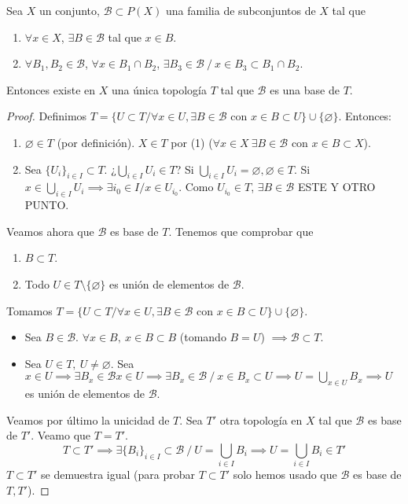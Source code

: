 \begin{nth}
  Sea $X$ un conjunto, $\mathcal{B} \subset P(X)$ una familia de subconjuntos de $X$ tal que
  \begin{enumerate}
    \item $\forall x \in X$, $\exists B \in \mathcal{B}$ tal que $x \in B$.
    \item $\forall B_1,B_2 \in \mathcal{B}$, $\forall x \in B_1 \cap B_2$, $\exists B_3 \in \mathcal{B}\ /\ x \in B_3 \subset B_1 \cap B_2$.
  \end{enumerate}
  Entonces existe en $X$ una única topología $T$ tal que $\mathcal{B}$ es una base de $T$.
\end{nth}
\begin{proof}
  Definimos $T=\{U \subset T / \forall x \in U, \exists B \in \mathcal{B}$ con $ x \in B \subset U\} \cup \{\varnothing \}$. Entonces:
  \begin{enumerate}
    \item $\varnothing \in T$ (por definición). $X \in T$ por (1) ($\forall x \in X\ \exists B \in \mathcal{B}$ con $x \in B \subset X$).
    \item Sea $\{U_i\}_{i \in I} \subset T$. ¿$\bigcup_{i \in I} U_i \in T$? Si $\bigcup_{i \in I} U_i = \varnothing , \varnothing \in T$. Si $x \in \bigcup_{i \in I} U_i \implies \exists i_0 \in I / x \in U_{i_0}$. Como $U_{i_0} \in T$, $\exists B \in \mathcal{B}$ ESTE Y OTRO PUNTO.
  \end{enumerate}
  Veamos ahora que $\mathcal{B}$ es base de $T$. Tenemos que comprobar que
  \begin{enumerate}
    \item $B \subset T$.
    \item Todo $U \in T \setminus \{\varnothing \}$ es unión de elementos de $\mathcal{B}$.
  \end{enumerate}
  Tomamos $T=\{U \subset T / \forall x \in U, \exists B \in \mathcal{B}$ con $ x \in B \subset U\} \cup \{\varnothing \}$.
  \begin{itemize}
    \item Sea $B \in \mathcal{B}$. $\forall x \in B,\ x \in B \subset B$ (tomando $B=U$) $\implies \mathcal{B} \subset T$.
    \item Sea $U \in T,\ U \neq \varnothing $. Sea $x \in U \implies \exists B_x \in \mathcal{B}x \in U \implies \exists B_x \in \mathcal{B}\ /\ x \in B_x \subset U \implies U = \bigcup_{x \in U} B_x \implies U$ es unión de elementos de $\mathcal{B}$.
  \end{itemize}
  Veamos por último la unicidad de $T$. Sea $T'$ otra topología en $X$ tal que $\mathcal{B}$ es base de $T'$. Veamo que $T=T'$. \[T \subset T' \implies \exists \{B_i\}_{i \in I} \subset \mathcal{B}\ /\ U = \bigcup_{i \in I} B_i \implies U = \bigcup_{i \in I} B_i \in T' \]
  $T \subset T'$ se demuestra igual (para probar $T \subset T'$ solo hemos usado que $\mathcal{B}$ es base de $T,T'$).
\end{proof}
